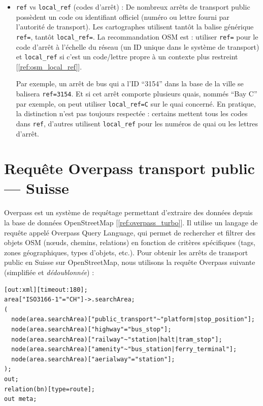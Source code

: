 \begin{itemize}
    \item \texttt{ref} vs \texttt{local\_ref} (codes d'arrêt) : De nombreux arrêts de transport public possèdent un code ou identifiant officiel (numéro ou lettre fourni par l'autorité de transport). Les cartographes utilisent tantôt la balise générique \texttt{ref=}, tantôt \texttt{local\_ref=}. La recommandation OSM est : utiliser \texttt{ref=} pour le code d'arrêt à l'échelle du réseau (un ID unique dans le système de transport) et \texttt{local\_ref} si c'est un code/lettre propre à un contexte plus restreint [\ref{ref:osm_local_ref}].
    
    Par exemple, un arrêt de bus qui a l'ID ``3154'' dans la base de la ville se balisera \texttt{ref=3154}. Et si cet arrêt comporte plusieurs quais, nommés ``Bay C'' par exemple, on peut utiliser \texttt{local\_ref=C} sur le quai concerné. En pratique, la distinction n’est pas toujours respectée : certains mettent tous les codes dans \texttt{ref}, d’autres utilisent \texttt{local\_ref} pour les numéros de quai ou les lettres d’arrêt.
\end{itemize}

\section{Requête Overpass transport public — Suisse}
Overpass est un système de requêtage permettant d'extraire des données depuis la base de données OpenStreetMap [\ref{ref:overpass_turbo}]. Il utilise un langage de requête appelé Overpass Query Language, qui permet de rechercher et filtrer des objets OSM (nœuds, chemins, relations) en fonction de critères spécifiques (tags, zones géographiques, types d'objets, etc.).
Pour obtenir les arrêts de transport public en Suisse sur OpenStreetMap, nous utilisons la requête Overpass suivante (simplifiée et \textit{dédoublonnée}) :

\begin{tcolorbox}[colback=gray!10, colframe=brown, title=Requête Overpass]
\begin{verbatim}
[out:xml][timeout:180];
area["ISO3166-1"="CH"]->.searchArea;
(
  node(area.searchArea)["public_transport"~"platform|stop_position"];
  node(area.searchArea)["highway"="bus_stop"];
  node(area.searchArea)["railway"~"station|halt|tram_stop"];
  node(area.searchArea)["amenity"~"bus_station|ferry_terminal"];
  node(area.searchArea)["aerialway"="station"];
);
out;
relation(bn)[type=route];
out meta;
\end{verbatim}
\end{tcolorbox}

